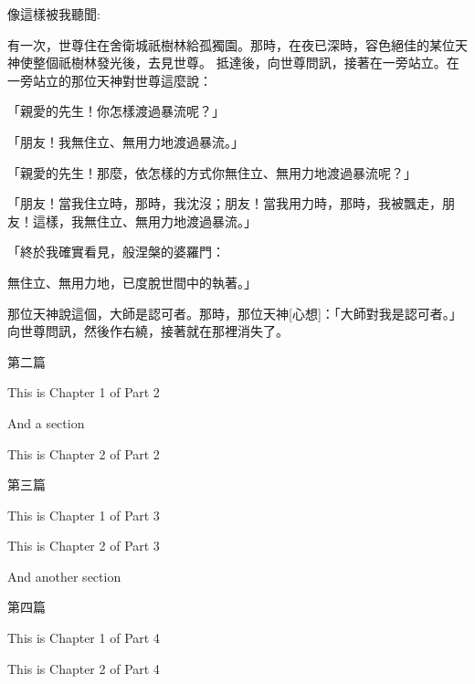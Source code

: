 \documentclass[a5paper,12pt]{book}
\begin{document}


像這樣被我聽聞:

有一次，世尊住在舍衛城祇樹林給孤獨園。那時，在夜已深時，容色絕佳的某位天神使整個祇樹林發光後，去見世尊。
抵達後，向世尊問訊，接著在一旁站立。在一旁站立的那位天神對世尊這麼說：

「親愛的先生！你怎樣渡過暴流呢？」

「朋友！我無住立、無用力地渡過暴流。」

「親愛的先生！那麼，依怎樣的方式你無住立、無用力地渡過暴流呢？」

「朋友！當我住立時，那時，我沈沒；朋友！當我用力時，那時，我被飄走，朋友！這樣，我無住立、無用力地渡過暴流。」

「終於我確實看見，般涅槃的婆羅門：

無住立、無用力地，已度脫世間中的執著。」

那位天神說這個，大師是認可者。那時，那位天神[心想]：「大師對我是認可者。」向世尊問訊，然後作右繞，接著就在那裡消失了。

\clearpage

第二篇
This is Chapter 1 of Part 2
And a section
\clearpage
This is Chapter 2 of Part 2
\clearpage

第三篇
This is Chapter 1 of Part 3
\clearpage
This is Chapter 2 of Part 3
And another section
\clearpage
第四篇
This is Chapter 1 of Part 4
\clearpage
This is Chapter 2 of Part 4
\clearpage
\end{document}
